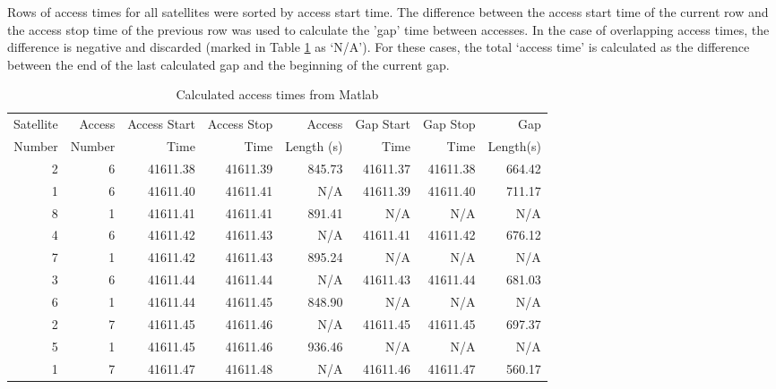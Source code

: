 Rows of access times for all satellites were sorted by access start time. The difference between the access start time of the current row and the access stop time of the previous row was used to calculate the 'gap' time between accesses. In the case of overlapping access times, the difference is negative and discarded (marked in Table \ref{tab:results_matlab} as `N/A'). For these cases, the total `access time' is calculated as the difference between the end of the last calculated gap and the beginning of the current gap. 
\begin{table}[htbp]
  \centering
  \caption{Calculated access times from Matlab}
    \begin{tabular}{rrrrrrrr}
    \toprule
    Satellite & Access & Access Start & Access  Stop & Access & Gap Start & Gap Stop & Gap \vspace{-3mm} \\
    
    Number & Number & Time & Time & Length (s) & Time & Time & Length(s)\\
    \midrule
    2     & 6     & 41611.38 & 41611.39 & 845.73 & 41611.37 & 41611.38 & 664.42 \\
    1     & 6     & 41611.40 & 41611.41 & N/A  & 41611.39 & 41611.40 & 711.17 \\
    8     & 1     & 41611.41 & 41611.41 & 891.41 & N/A  & N/A  & N/A \\
    4     & 6     & 41611.42 & 41611.43 & N/A  & 41611.41 & 41611.42 & 676.12 \\
    7     & 1     & 41611.42 & 41611.43 & 895.24 & N/A  & N/A  & N/A \\
    3     & 6     & 41611.44 & 41611.44 & N/A  & 41611.43 & 41611.44 & 681.03 \\
    6     & 1     & 41611.44 & 41611.45 & 848.90 & N/A  & N/A  & N/A \\
    2     & 7     & 41611.45 & 41611.46 & N/A  & 41611.45 & 41611.45 & 697.37 \\
    5     & 1     & 41611.45 & 41611.46 & 936.46 & N/A  & N/A  & N/A \\
    1     & 7     & 41611.47 & 41611.48 & N/A  & 41611.46 & 41611.47 & 560.17\\
    \bottomrule
    \end{tabular}%
  \label{tab:results_matlab}%
\end{table}%

